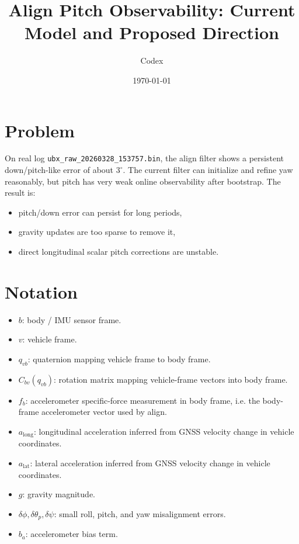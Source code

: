 \documentclass[11pt]{article}
\title{Align Pitch Observability: Current Model and Proposed Direction}
\author{Codex}
\date{\today}
\begin{document}
\maketitle

\section{Problem}
On real log \texttt{ubx\_raw\_20260328\_153757.bin}, the align filter shows a persistent down/pitch-like error of about \(3^\circ\). The current filter can initialize and refine yaw reasonably, but pitch has very weak online observability after bootstrap. The result is:
\begin{itemize}[leftmargin=1.5em]
\item pitch/down error can persist for long periods,
\item gravity updates are too sparse to remove it,
\item direct longitudinal scalar pitch corrections are unstable.
\end{itemize}

\section{Notation}
\begin{itemize}[leftmargin=1.5em]
\item \(b\): body / IMU sensor frame.
\item \(v\): vehicle frame.
\item \(q_{vb}\): quaternion mapping vehicle frame to body frame.
\item \(C_{bv}(q_{vb})\): rotation matrix mapping vehicle-frame vectors into body frame.
\item \(f_b\): accelerometer specific-force measurement in body frame, i.e. the body-frame accelerometer vector used by align.
\item \(a_{\text{long}}\): longitudinal acceleration inferred from GNSS velocity change in vehicle coordinates.
\item \(a_{\text{lat}}\): lateral acceleration inferred from GNSS velocity change in vehicle coordinates.
\item \(g\): gravity magnitude.
\item \(\delta\phi,\delta\theta_p,\delta\psi\): small roll, pitch, and yaw misalignment errors.
\item \(b_a\): accelerometer bias term.
\end{itemize}
\end{document}
